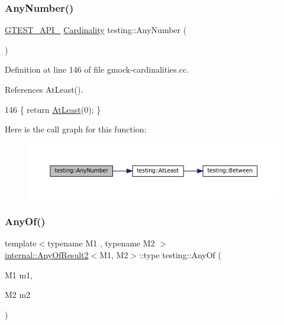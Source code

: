 \subsubsection{\texorpdfstring{Any\+Number()}{AnyNumber()}}
{\footnotesize\ttfamily \hyperlink{gtest-port_8h_aa73be6f0ba4a7456180a94904ce17790}{G\+T\+E\+S\+T\+\_\+\+A\+P\+I\+\_\+} \hyperlink{classtesting_1_1Cardinality}{Cardinality} testing\+::\+Any\+Number (\begin{DoxyParamCaption}{ }\end{DoxyParamCaption})}



Definition at line 146 of file gmock-\/cardinalities.\+cc.



References At\+Least().


\begin{DoxyCode}
146 \{ \textcolor{keywordflow}{return} \hyperlink{namespacetesting_a137297cb3c582843989fbd937cf0fed2}{AtLeast}(0); \}
\end{DoxyCode}
Here is the call graph for this function\+:
\nopagebreak
\begin{figure}[H]
\begin{center}
\leavevmode
\includegraphics[width=350pt]{namespacetesting_aa1f8a6371097e1e9b8d6866020f35252_cgraph}
\end{center}
\end{figure}
\mbox{\label{namespacetesting_a81cfefd9f75cdce827d5bc873cf73aac}} 
\subsubsection{\texorpdfstring{Any\+Of()}{AnyOf()}\hspace{0.1cm}{\footnotesize\ttfamily [1/9]}}
{\footnotesize\ttfamily template$<$typename M1 , typename M2 $>$ \\
\hyperlink{structtesting_1_1internal_1_1AnyOfResult2}{internal\+::\+Any\+Of\+Result2}$<$M1, M2$>$\+::type testing\+::\+Any\+Of (\begin{DoxyParamCaption}\item[{M1}]{m1,  }\item[{M2}]{m2 }\end{DoxyParamCaption})\hspace{0.3cm}{\ttfamily [inline]}}



